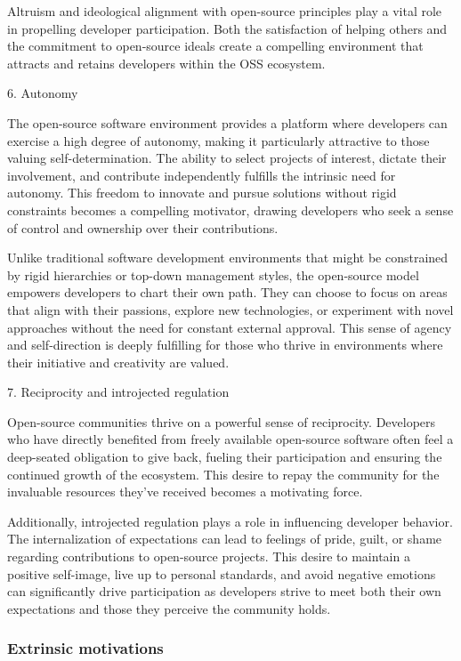 Altruism and ideological alignment with open-source principles play a vital role in propelling developer participation. Both the satisfaction of helping others and the commitment to open-source ideals create a compelling environment that attracts and retains developers within the OSS ecosystem.

6. Autonomy

The open-source software environment provides a platform where developers can exercise a high degree of autonomy, making it particularly attractive to those valuing self-determination. The ability to select projects of interest, dictate their involvement, and contribute independently fulfills the intrinsic need for autonomy. This freedom to innovate and pursue solutions without rigid constraints becomes a compelling motivator, drawing developers who seek a sense of control and ownership over their contributions.

Unlike traditional software development environments that might be constrained by rigid hierarchies or top-down management styles, the open-source model empowers developers to chart their own path. They can choose to focus on areas that align with their passions, explore new technologies, or experiment with novel approaches without the need for constant external approval.  This sense of agency and self-direction is deeply fulfilling for those who thrive in environments where their initiative and creativity are valued.

7. Reciprocity and introjected regulation

Open-source communities thrive on a powerful sense of reciprocity. Developers who have directly benefited from freely available open-source software often feel a deep-seated obligation to give back, fueling their participation and ensuring the continued growth of the ecosystem. This desire to repay the community for the invaluable resources they've received becomes a motivating force.

Additionally, introjected regulation plays a role in influencing developer behavior. The internalization of expectations can lead to feelings of pride, guilt, or shame regarding contributions to open-source projects. This desire to maintain a positive self-image, live up to personal standards, and avoid negative emotions can significantly drive participation as developers strive to meet both their own expectations and those they perceive the community holds.

\subsubsection{Extrinsic motivations}

